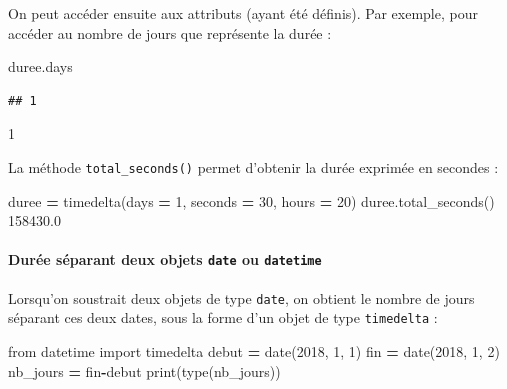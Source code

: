 \documentclass[
  12pt,
]{book}
\newenvironment{Shaded}{\begin{snugshade}}{\end{snugshade}}
\newcommand{\BuiltInTok}[1]{#1}
\newcommand{\DecValTok}[1]{\textcolor[rgb]{0.00,0.00,0.81}{#1}}
\newcommand{\FloatTok}[1]{\textcolor[rgb]{0.00,0.00,0.81}{#1}}
\newcommand{\ImportTok}[1]{#1}
\newcommand{\NormalTok}[1]{#1}
\newcommand{\OperatorTok}[1]{\textcolor[rgb]{0.81,0.36,0.00}{\textbf{#1}}}
\numberwithin{equation}{section}
\numberwithin{countremarque}{section}
\begin{document}
On peut accéder ensuite aux attributs (ayant été définis). Par exemple, pour accéder au nombre de jours que représente la durée :

\begin{Shaded}
\begin{Highlighting}[]
\NormalTok{duree.days}
\end{Highlighting}
\end{Shaded}

\begin{lstlisting}
## 1
\end{lstlisting}

\begin{Shaded}
\begin{Highlighting}[]
\DecValTok{1}
\end{Highlighting}
\end{Shaded}

La méthode \texttt{total\_seconds()} permet d'obtenir la durée exprimée en secondes :

\begin{Shaded}
\begin{Highlighting}[]
\NormalTok{duree }\OperatorTok{=}\NormalTok{ timedelta(days }\OperatorTok{=} \DecValTok{1}\NormalTok{, seconds }\OperatorTok{=} \DecValTok{30}\NormalTok{, hours }\OperatorTok{=} \DecValTok{20}\NormalTok{)}
\NormalTok{duree.total\_seconds()}
\FloatTok{158430.0}
\end{Highlighting}
\end{Shaded}

\paragraph{\texorpdfstring{Durée séparant deux objets \texttt{date} ou \texttt{datetime}}{Durée séparant deux objets date ou datetime}}\label{duruxe9e-suxe9parant-deux-objets-date-ou-datetime}

Lorsqu'on soustrait deux objets de type \texttt{date}, on obtient le nombre de jours séparant ces deux dates, sous la forme d'un objet de type \texttt{timedelta} :

\begin{Shaded}
\begin{Highlighting}[]
\ImportTok{from}\NormalTok{ datetime }\ImportTok{import}\NormalTok{ timedelta}
\NormalTok{debut }\OperatorTok{=}\NormalTok{ date(}\DecValTok{2018}\NormalTok{, }\DecValTok{1}\NormalTok{, }\DecValTok{1}\NormalTok{)}
\NormalTok{fin }\OperatorTok{=}\NormalTok{ date(}\DecValTok{2018}\NormalTok{, }\DecValTok{1}\NormalTok{, }\DecValTok{2}\NormalTok{)}
\NormalTok{nb\_jours }\OperatorTok{=}\NormalTok{ fin}\OperatorTok{{-}}\NormalTok{debut}
\BuiltInTok{print}\NormalTok{(}\BuiltInTok{type}\NormalTok{(nb\_jours))}
\end{Highlighting}
\end{Shaded}
\end{document}
